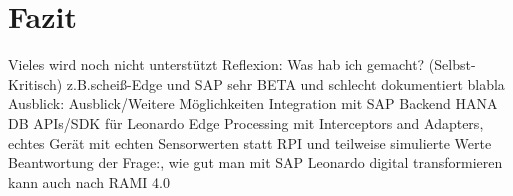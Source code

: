 \section{Fazit}

Vieles wird noch nicht unterstützt
Reflexion:
Was hab ich gemacht? (Selbst-Kritisch) z.B.scheiß-Edge und SAP sehr BETA und schlecht dokumentiert blabla
\newline
Ausblick:
Ausblick/Weitere Möglichkeiten
Integration mit SAP Backend
HANA DB
APIs/SDK für Leonardo
Edge Processing mit Interceptors and Adapters, echtes Gerät mit echten Sensorwerten statt RPI und teilweise simulierte Werte
\newline
Beantwortung der Frage:, wie gut man mit SAP Leonardo digital transformieren kann auch nach RAMI 4.0

\newpage
